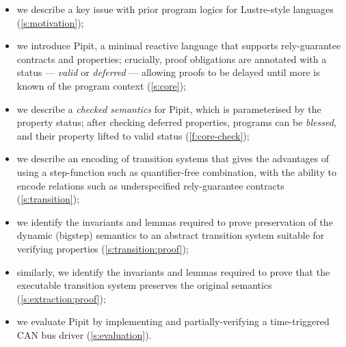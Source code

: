 \begin{itemize}
  \item we describe a key issue with prior program logics for Lustre-style languages (\autoref{s:motivation});
  \item we introduce Pipit, a minimal reactive language that supports rely-guarantee contracts and properties; crucially, proof obligations are annotated with a status --- \emph{valid} or \emph{deferred} --- allowing proofs to be delayed until more is known of the program context (\autoref{s:core});
  \item we describe a \emph{checked semantics} for Pipit, which is parameterised by the property status; after checking deferred properties, programs can be \emph{blessed}, and their property lifted to valid status (\autoref{f:core-check});
  \item we describe an encoding of transition systems that gives the advantages of using a step-function such as quantifier-free combination, with the ability to encode relations such as underspecified rely-guarantee contracts (\autoref{s:transition});
  \item we identify the invariants and lemmas required to prove preservation of the dynamic (bigstep) semantics to an abstract transition system suitable for verifying properties (\autoref{s:transition:proof});
  \item similarly, we identify the invariants and lemmas required to prove that the executable transition system preserves the original semantics (\autoref{s:extraction:proof});
  \item we evaluate Pipit by implementing and partially-verifying a time-triggered CAN bus driver (\autoref{s:evaluation}).
\end{itemize}


